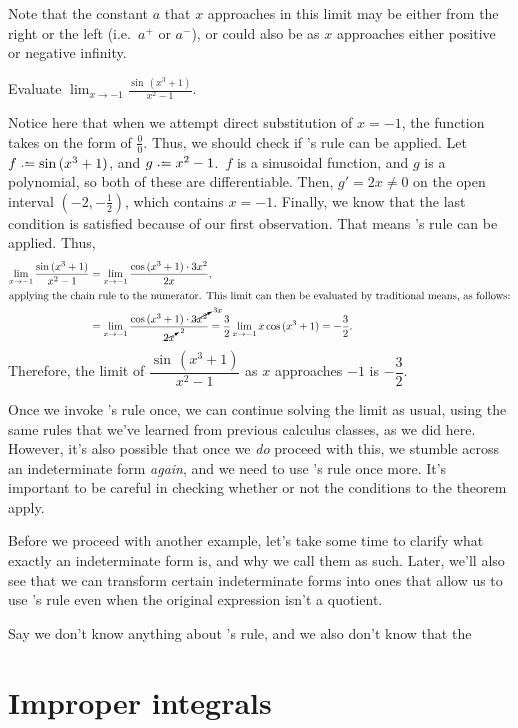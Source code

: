 Note that the constant \(a\) that \(x\) approaches in this limit may be either from the right or the left (i.e.\ \(a^+\) or \(a^-\)), or could also be as \(x\) 
approaches either positive or negative infinity.\par 
\begin{example}
    Evaluate \(\displaystyle{} \lim_{x\to -1} \frac{\sin \,(x^3 + 1)}{x^2 -1 }\).\par 
    Notice here that when we attempt direct substitution of \(x = -1 \), the function takes on the form of \(\frac{0}{0}\). Thus, we should check if \lh's rule can be applied. 
    Let \(f \defeq \sin\, (x^3 + 1)\), and \( g \defeq x^2 - 1\).\ \(f\) is a sinusoidal function, and \(g\) is a polynomial, so both of these are differentiable. Then, \(g' = 2x \neq 0\) on 
    the open interval \((-2, -\frac{1}{2})\), which contains \(x = -1\). Finally, we know that the last condition is satisfied because of our first observation. That means \lh's rule 
    can be applied. Thus,\begin{align*}
        \lim_{x\to -1} \frac{\sin \,(x^3 + 1)}{x^2 -1 } &= \lim_{x \to -1} \frac{\cos \, (x^3 + 1) \cdot 3x^2}{2x},\\ 
        \intertext{applying the chain rule to the numerator. This limit can then be evaluated by traditional means, as follows:}
        &= \lim_{x \to -1} \frac{\cos \, (x^3 + 1) \cdot \cancelto{3x}{3x^2}}{\cancelto{2}{2x}} = \frac{3}{2} \lim_{x\to -1} x \cos\, (x^3 + 1) = -\frac{3}{2}. 
    \end{align*}
    Therefore, the limit of \(\dfrac{\sin \,(x^3 + 1)}{x^2 -1 }\) as \(x\) approaches \(-1\) is \(-\dfrac{3}{2}\). 
\end{example} 
Once we invoke \lh's rule once, we can continue solving the limit as usual, using the same rules that we've learned from previous calculus classes, as we did here. However, it's also 
possible that once we \textit{do} proceed with this, we stumble across an indeterminate form \textit{again}, and we need to use \lh's rule once more. It's important to be 
careful in checking whether or not the conditions to the theorem apply.\par 
Before we proceed with another example, let's take some time to clarify what exactly an indeterminate form is, and why we call them as such. Later, we'll also see that we can transform certain indeterminate forms 
into ones that allow us to use \lh's rule even when the original expression isn't a quotient.
\begin{center}
    \colorbox{CornflowerBlue!20}{\begin{minipage}{0.97\textwidth}
        Say we don't know anything about \lh's rule, and we also don't know that the 
    \end{minipage}}
\end{center}
\section{Improper integrals}

